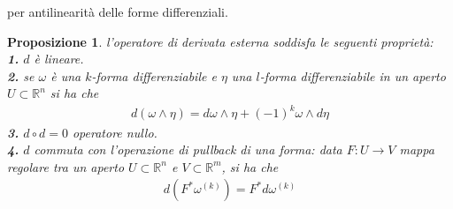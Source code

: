 \documentclass[twoside, 11pt]{amsbook}
\newcommand{\0}{{(0)}}
\newcommand{\3}{{(3)}}
\theoremstyle{colonplain}
\newtheorem{prop}[thm]{Proposizione}
\theoremstyle{colondefinition}
\theoremstyle{colonremark}
\numberwithin{equation}{chapter}
\begin{document}
per antilinearità delle forme differenziali.
\begin{prop} l'operatore di derivata esterna soddisfa le seguenti proprietà: \\
\textbf{1.} $d$ è lineare. \\
\textbf{2.} se $\omega$ è una $k$-forma differenziabile e $\eta$ una $l$-forma differenziabile in un aperto $U \subset \mathbb{R}^n$ si ha che
\begin{align}
    d(\omega \wedge \eta) = d\omega \wedge \eta + (-1)^k\omega \wedge d\eta
\end{align}
\textbf{3.} $d \circ d = 0$ operatore nullo. \\
\textbf{4.} $d$ commuta con l'operazione di pullback di una forma: data $F : U \longrightarrow V$ mappa regolare tra un aperto $U \subset \mathbb{R}^n$ e $V \subset \mathbb{R}^m$, si ha che
\begin{align}
    d(F^*\omega^{(k)}) = F^*d\omega^{(k)}
\end{align}
\end{prop}
\end{document}
